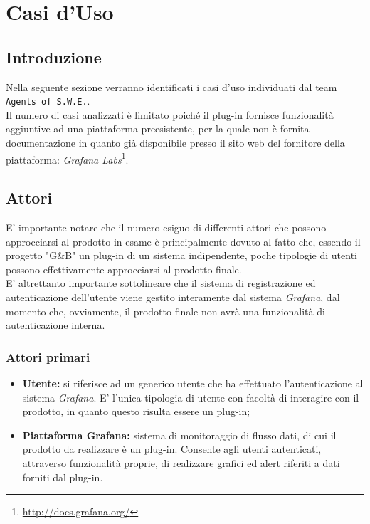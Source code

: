\section{Casi d'Uso}\label{CasiUso}
\subsection{Introduzione}\label{CasiUso_Introduzione}
Nella seguente sezione verranno identificati i casi d'uso individuati dal team \texttt{Agents of S.W.E.}.\\
Il numero di casi analizzati è limitato poiché il plug-in fornisce funzionalità aggiuntive ad una piattaforma preesistente, per la quale non è fornita documentazione in quanto già disponibile presso il sito web del fornitore della piattaforma: \textit{Grafana Labs}\footnote{\url{http://docs.grafana.org/}}.

\subsection{Attori}\label{Attori}
E' importante notare che il numero esiguo di differenti attori che possono approcciarsi al prodotto in esame è principalmente dovuto al fatto che, essendo il progetto "G\&B" un plug-in di un sistema indipendente, poche tipologie di utenti possono effettivamente approcciarsi al prodotto finale.\\
E' altrettanto importante sottolineare che il sistema di registrazione ed autenticazione dell'utente viene gestito interamente dal sistema \textit{Grafana}, dal momento che, ovviamente, il prodotto finale non avrà una funzionalità di autenticazione interna.

\subsubsection*{Attori primari}
\begin{itemize}
\item \textbf{Utente:} si riferisce ad un generico utente che ha effettuato l'autenticazione al sistema \textit{Grafana}. E' l'unica tipologia di utente con facoltà di interagire con il prodotto, in quanto questo risulta essere un plug-in;
\item \textbf{Piattaforma Grafana:} sistema di monitoraggio di flusso dati, di cui il prodotto da realizzare è un plug-in. Consente agli utenti autenticati, attraverso funzionalità proprie, di realizzare grafici ed alert riferiti a dati forniti dal plug-in.
\end{itemize}

